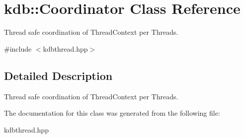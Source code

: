 \hypertarget{classkdb_1_1Coordinator}{\section{kdb\-:\-:Coordinator Class Reference}
\label{classkdb_1_1Coordinator}
}


Thread safe coordination of Thread\-Context per Threads.  




{\ttfamily \#include $<$kdbthread.\-hpp$>$}



\subsection{Detailed Description}
Thread safe coordination of Thread\-Context per Threads. 

The documentation for this class was generated from the following file\-:\begin{DoxyCompactItemize}
\item 
kdbthread.\-hpp\end{DoxyCompactItemize}

